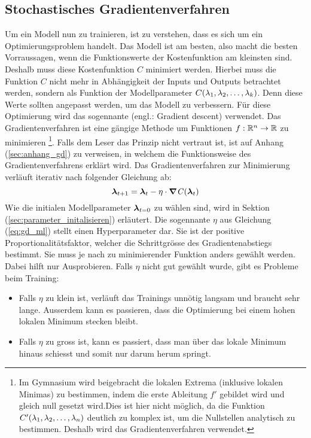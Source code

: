 \subsection{Stochastisches Gradientenverfahren}\label{sec:gradientenverfahren}
Um ein Modell nun zu trainieren, ist zu verstehen, dass es sich um ein Optimierungsproblem handelt.
Das Modell ist am besten, also macht die besten Vorraussagen, wenn die
Funktionswerte der Kostenfunktion am kleinsten sind.
Deshalb muss diese Kostenfunktion $C$ minimiert werden.
Hierbei muss die Funktion $C$ nicht mehr in Abhängigkeit der Inputs und Outputs betrachtet
werden, sondern als Funktion der Modellparameter
$C(\lambda_1, \lambda_2, \ldots, \lambda_k)$. Denn diese Werte sollten angepasst
werden, um das Modell zu verbessern.
\para{}
Für diese Optimierung wird das sogennante  (engl.: Gradient descent) verwendet.
Das Gradientenverfahren ist eine gängige Methode um Funktionen $f: \mathbb{R}^n \to
\mathbb{R}$ zu minimieren
\footnote{Im Gymnasium wird beigebracht die lokalen Extrema (inklusive lokalen Minimas) zu
  bestimmen, indem die erste Ableitung $f'$ gebildet wird und gleich null gesetzt
  wird.Dies ist hier nicht möglich, da die Funktion
  $C'(\lambda_1,\lambda_2,\ldots,\lambda_n)$ deutlich zu komplex ist, um die
  Nullstellen analytisch zu bestimmen. Deshalb wird das Gradientenverfahren
  verwendet.
}.
Falls dem Leser das Prinzip nicht vertraut ist, ist auf Anhang
(\ref{sec:anhang_gd}) zu verweisen, in
welchem die Funktionsweise des Gradientenverfahrens erklärt wird.
\para{}
Das Gradientenverfahren zur Minimierung verläuft iterativ nach folgender
Gleichung ab:
\begin{equation}\label{eq:gd_ml}
  \bm{\lambda}_{t+1} = \bm{\lambda}_t - \eta \cdot \bm{\nabla} \mathit{C}(\bm{\lambda}_t)
\end{equation}
Wie die initialen Modellparameter $\bm{\lambda}_{t=0}$ zu wählen sind, wird in Sektion
(\ref{sec:parameter_initalisieren}) erläutert.
\para{}
Die sogennante  $\eta$ aus Gleichung (\ref{eq:gd_ml}) stellt
einen Hyperparameter dar. Sie ist der positive Proportionalitätsfaktor, welcher die Schrittgrösse des
Gradientenabstiegs bestimmt.
Sie muss je nach zu minimierender Funktion anders gewählt werden.
Dabei hilft nur Ausprobieren. Falls $\eta$ nicht gut gewählt wurde, gibt es Probleme beim Training:
\begin{itemize}
\item{Falls $\eta$ zu klein ist, verläuft das Trainings unnötig langsam und braucht sehr lange.
    Ausserdem kann es passieren, dass die Optimierung bei einem hohen lokalen Minimum stecken bleibt.}

\item{Falls $\eta$ zu gross ist, kann es passiert, dass man über das lokale
    Minimum hinaus schiesst und somit nur darum herum springt.}
\end{itemize}

